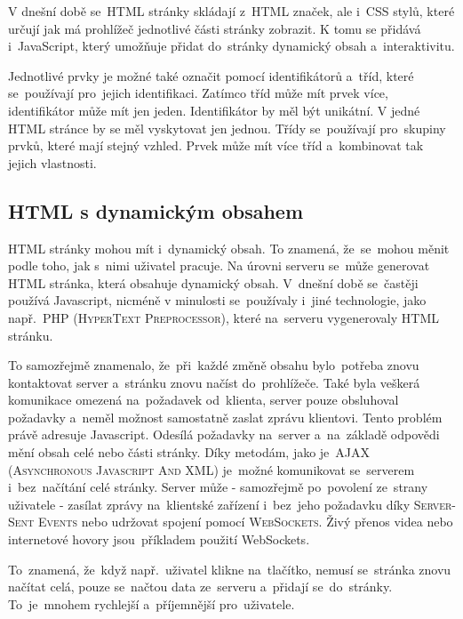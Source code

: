 \documentclass[14pt,a4paper]{article}
\begin{document}
        V dnešní době se~HTML stránky skládají z~HTML značek, ale i~CSS stylů, které určují jak má prohlížeč jednotlivé části stránky zobrazit.
        K tomu se přidává i~JavaScript, který umožňuje přidat do~stránky dynamický obsah a~interaktivitu. \parencite{berners:1989:proposal}

        Jednotlivé prvky je možné také označit pomocí identifikátorů a~tříd, které se~používají pro~jejich identifikaci.
        Zatímco tříd může mít prvek více, identifikátor může mít jen jeden. Identifikátor by měl být unikátní. V jedné HTML stránce by se měl vyskytovat jen jednou.
        Třídy se~používají pro~skupiny prvků, které mají stejný vzhled. Prvek může mít více tříd a~kombinovat tak jejich vlastnosti. \parencite{jpw:tridy}

        \subsection{HTML s dynamickým obsahem}
        HTML stránky mohou mít i~dynamický obsah. To znamená, že~se~mohou měnit podle toho, jak s~nimi uživatel pracuje.
        Na úrovni serveru se~může generovat HTML stránka, která obsahuje dynamický obsah. V~dnešní době se~častěji používá Javascript,
        nicméně v minulosti se~používaly i~jiné technologie, jako např.~\textsc{PHP (HyperText Preprocessor)}, které na~serveru vygenerovaly HTML stránku.

        To samozřejmě znamenalo, že~při~každé změně obsahu bylo~potřeba znovu kontaktovat server a~stránku znovu načíst do~prohlížeče. Také byla veškerá komunikace omezená na~požadavek od~klienta, server pouze obsluhoval požadavky a~neměl možnost samostatně zaslat zprávu klientovi.
        Tento problém právě adresuje Javascript. Odesílá požadavky na~server a~na~základě odpovědi mění obsah celé nebo části stránky. Díky metodám, jako je~\textsc{AJAX (Asynchronous Javascript And XML)}\parencite{ajax:mdn} je~možné komunikovat se~serverem i~bez~načítání celé stránky.
        Server může - samozřejmě po~povolení ze~strany uživatele - zasílat zprávy na~klientské zařízení i~bez~jeho požadavku díky \textsc{Server-Sent Events}\parencite{sse:mdn} nebo udržovat spojení pomocí \textsc{WebSockets}\parencite{websocket:mdn}. Živý přenos videa nebo internetové hovory jsou~příkladem použití WebSockets.

        To~znamená, že~když např.~uživatel klikne na~tlačítko, nemusí se~stránka znovu načítat celá, pouze se~načtou data ze~serveru
        a~přidají se~do~stránky. To~je~mnohem rychlejší a~příjemnější pro~uživatele.
\end{document}
